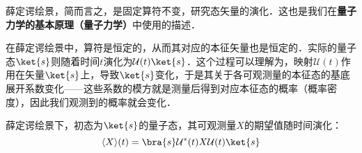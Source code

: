 薛定谔绘景，简而言之，是固定算符不变，研究态矢量的演化．这也是我们在\textbf{量子力学的基本原理（量子力学）}中使用的描述．

在薛定谔绘景中，算符是恒定的，从而其对应的本征矢量也是恒定的．实际的量子态$\ket{s}$则随着时间$t$演化为$\mathcal{U}(t)\ket{s}$．这个过程可以理解为，映射$\mathcal{U}(t)$作用在矢量$\ket{s}$上，导致$\ket{s}$变化，于是其关于各可观测量的本征态的基底展开系数变化——这些系数的模方就是测量后得到对应本征态的概率（概率密度），因此我们观测到的概率就会变化．

薛定谔绘景下，初态为$\ket{s}$的量子态，其可观测量$X$的期望值随时间演化：
\begin{equation}
\langle X \rangle(t) = \bra{s}\mathcal{U}^*(t)X\mathcal{U}(t)\ket{s}
\end{equation}



















